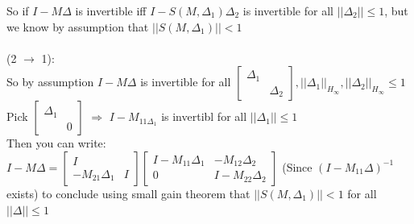 \documentclass{article}[12pt]
\newcommand{\norm}[1]{\left|\left|#1\right|\right|}
\begin{document}
So if $I- M\Delta$ is invertible iff $I-S(M,\Delta_1)\Delta_2$ is invertible for all $\norm{\Delta_2}\leq 1$, but we know by assumption that $\norm{S(M,\Delta_1)}<1$\\ \\
(2 $\xrightarrow{}$ 1):\\
So by assumption $I- M\Delta$ is invertible for all $\begin{bmatrix}\Delta_1& \\&\Delta_2\end{bmatrix}, \norm{\Delta_1}_{H_{\infty}}, \norm{\Delta_2}_{H_{\infty}} \leq 1$\\
Pick $\begin{bmatrix}\Delta_1& \\&0\end{bmatrix}$ $\Longrightarrow$ $I- M_{11\Delta_1}$ is invertibl for all $\norm{\Delta_1}\leq 1$\\
Then you can write:\\
$I- M\Delta = \begin{bmatrix}I&\\ -M_{21}\Delta_1&I \end{bmatrix}\begin{bmatrix}I-M_{11}\Delta_1 & -M_{12}\Delta_2 \\ 0 & I-M_{22}\Delta_2 \end{bmatrix}$ (Since $(I- M_{11}\Delta)^{-1}$ exists) to conclude using small gain theorem that $\norm{S(M,\Delta_1)}<1 $ for all $\norm{\Delta} \leq 1$
\end{document}
